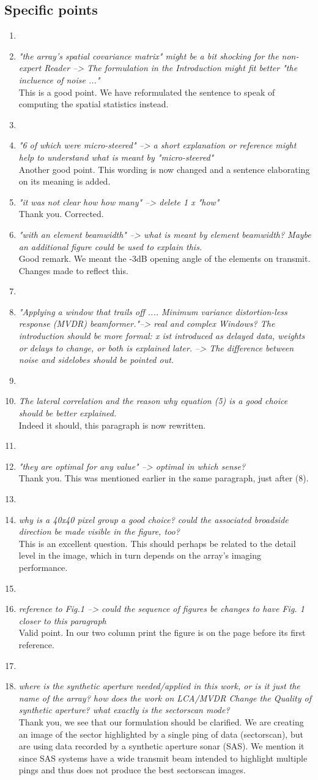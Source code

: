 \documentclass[11pt]{article} %
\newcommand\1{\vec 1}
\newcommand\q[1]{\textit{#1}}
\newcommand\qi[1]{\item\q{#1}}
\newcommand\hi[1]{\item[\textbf{#1}]}
\newcommand\ans[1]{#1}
\newcommand\ai[1]{\\[.5\baselineskip]\ans{#1}}
\begin{document}
\subsection*{Specific points}

\begin{enumerate}
\hi{Abstract}
\qi{"the array's spatial covariance matrix" might be a bit shocking for the non-expert Reader --> The formulation in the Introduction might fit better "the incluence of noise ..."}
\ai{This is a good point. We have reformulated the sentence to speak of computing the spatial statistics instead.}
%
\hi{Page 2}
\qi{"6 of which were micro-steered" --> a short explanation or reference might help to understand what is meant by "micro-steered"}
\ai{Another good point. This wording is now changed and a sentence elaborating on its meaning is added.}
%
\qi{"it was not clear how how many" --> delete 1 x "how"}
\ai{Thank you. Corrected.}
%
\qi{"with an element beamwidth" --> what is meant by element beamwidth? Maybe an additional figure could be used to explain this.}
\ai{Good remark. We meant the -3dB opening angle of the elements on transmit. Changes made to reflect this.}
%
\hi{Page 3, after (1)}
\qi{"Applying a window that trails off .... Minimum variance distortion-less response (MVDR) beamformer."--> real and complex Windows? The introduction should be more formal: x ist introduced as delayed data, weights or delays to change, or both is explained later. --> The difference between noise and sidelobes should be pointed out.}
\ai{}
%
\hi{Page 5, equation (5)}
\qi{The lateral correlation and the reason why equation (5) is a good choice should be better explained.}
\ai{Indeed it should, this paragraph is now rewritten.}
%
\hi{Page 6, last row}
\qi{"they are optimal for any value" --> optimal in which sense?}
\ai{Thank you. This was mentioned earlier in the same paragraph, just after (8).}
%
\hi{Fig 3}
\qi{why is a 40x40 pixel group a good choice? could the associated broadside direction be made visible in the figure, too?}
\ai{This is an excellent question. This should perhaps be related to the detail level in the image, which in turn depends on the array's imaging performance.}
%
\hi{Page 8}
\qi{reference to Fig.1 --> could the sequence of figures be changes to have Fig. 1 closer to this paragraph}
\ai{Valid point. In our two column print the figure is on the page before its first reference. }
%
\hi{Page 11}
\qi{where is the synthetic aperture needed/applied in this work, or is it just the name of the array? how does the work on LCA/MVDR Change the Quality of synthetic aperture?
what exactly is the sectorscan mode?}
\ai{Thank you, we see that our formulation should be clarified. We are creating an image of the sector highlighted by a single ping of data (sectorscan), but are using data recorded by a synthetic aperture sonar (SAS). We mention it since SAS systems have a wide transmit beam intended to highlight multiple pings and thus does not produce the best sectorscan images.}
%
\end{enumerate}
\end{document}
